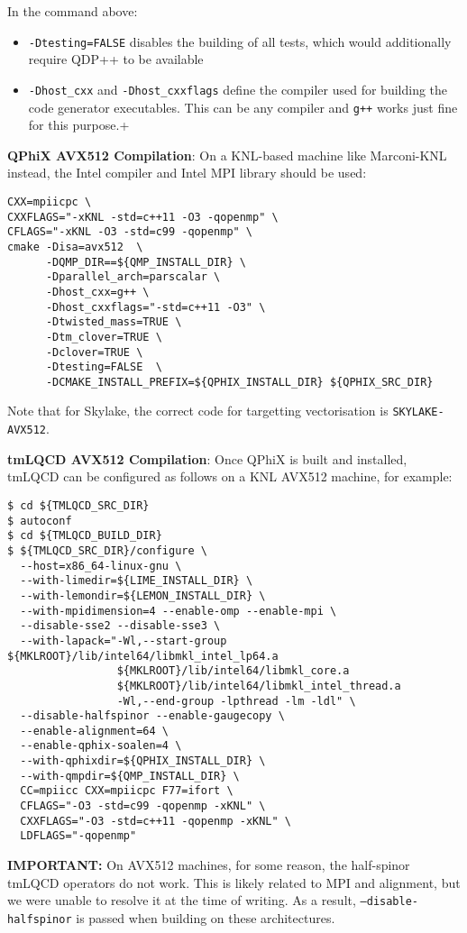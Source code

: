 In the command above:
\begin{itemize}
  \item{\texttt{-Dtesting=FALSE} disables the building of all tests, which would additionally require QDP++ to be available}
  \item{\texttt{-Dhost\_cxx} and \texttt{-Dhost\_cxxflags} define the compiler used for building the code generator executables. This can be any compiler and \texttt{g++} works just fine for this purpose.+}
\end{itemize}

\textbf{QPhiX AVX512 Compilation}: 
On a KNL-based machine like Marconi-KNL instead, the Intel compiler and Intel MPI library should be used:
\begin{framed}
\begin{Verbatim}
CXX=mpiicpc \
CXXFLAGS="-xKNL -std=c++11 -O3 -qopenmp" \
CFLAGS="-xKNL -O3 -std=c99 -qopenmp" \
cmake -Disa=avx512  \
      -DQMP_DIR==${QMP_INSTALL_DIR} \
      -Dparallel_arch=parscalar \
      -Dhost_cxx=g++ \
      -Dhost_cxxflags="-std=c++11 -O3" \
      -Dtwisted_mass=TRUE \
      -Dtm_clover=TRUE \
      -Dclover=TRUE \
      -Dtesting=FALSE  \
      -DCMAKE_INSTALL_PREFIX=${QPHIX_INSTALL_DIR} ${QPHIX_SRC_DIR}
\end{Verbatim}
\end{framed}

Note that for Skylake, the correct code for targetting vectorisation is \texttt{SKYLAKE-AVX512}.

\textbf{tmLQCD AVX512 Compilation}: Once QPhiX is built and installed, tmLQCD can be configured as follows on a KNL AVX512 machine, for example:
\begin{framed}
\begin{Verbatim}[fontsize=\small]
$ cd ${TMLQCD_SRC_DIR}
$ autoconf
$ cd ${TMLQCD_BUILD_DIR}
$ ${TMLQCD_SRC_DIR}/configure \
  --host=x86_64-linux-gnu \
  --with-limedir=${LIME_INSTALL_DIR} \
  --with-lemondir=${LEMON_INSTALL_DIR} \
  --with-mpidimension=4 --enable-omp --enable-mpi \
  --disable-sse2 --disable-sse3 \
  --with-lapack="-Wl,--start-group ${MKLROOT}/lib/intel64/libmkl_intel_lp64.a
                 ${MKLROOT}/lib/intel64/libmkl_core.a
                 ${MKLROOT}/lib/intel64/libmkl_intel_thread.a
                 -Wl,--end-group -lpthread -lm -ldl" \
  --disable-halfspinor --enable-gaugecopy \
  --enable-alignment=64 \
  --enable-qphix-soalen=4 \
  --with-qphixdir=${QPHIX_INSTALL_DIR} \
  --with-qmpdir=${QMP_INSTALL_DIR} \
  CC=mpiicc CXX=mpiicpc F77=ifort \
  CFLAGS="-O3 -std=c99 -qopenmp -xKNL" \
  CXXFLAGS="-O3 -std=c++11 -qopenmp -xKNL" \
  LDFLAGS="-qopenmp"
\end{Verbatim}
\end{framed}
\textbf{IMPORTANT:} On AVX512 machines, for some reason, the half-spinor tmLQCD operators do not work.
This is likely related to MPI and alignment, but we were unable to resolve it at the time of writing.
As a result, \texttt{--disable-halfspinor} is passed when building on these architectures.

